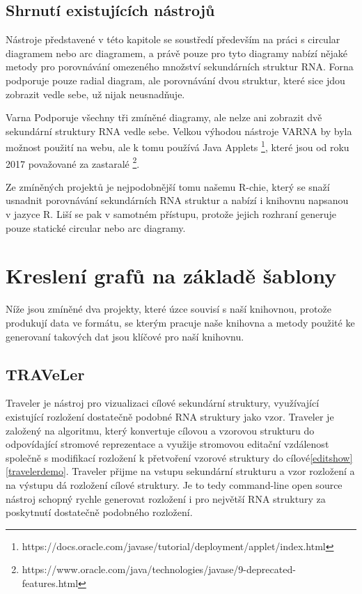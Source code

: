 
\subsection{Shrnutí existujících nástrojů}

Nástroje představené v této kapitole se soustředí především na práci s circular
diagramem nebo arc diagramem, a právě pouze pro tyto diagramy nabízí nějaké
metody pro porovnávání omezeného množství sekundárních struktur RNA. Forna
podporuje pouze radial diagram, ale porovnávání dvou struktur, které sice jdou
zobrazit vedle sebe, už nijak neusnadňuje. 

Varna Podporuje všechny tři zmíněné diagramy, ale nelze ani zobrazit dvě
sekundární struktury RNA vedle sebe. Velkou výhodou nástroje VARNA by byla
možnost použití na webu, ale k tomu používá Java Applets
\footnote{https://docs.oracle.com/javase/tutorial/deployment/applet/index.html},
které jsou od roku 2017 považované za zastaralé
\footnote{https://www.oracle.com/java/technologies/javase/9-deprecated-features.html}.

Ze zmíněných projektů je nejpodobnější tomu našemu R-chie, který se snaží
usnadnit porovnávání sekundárních RNA struktur a nabízí i knihovnu napsanou v
jazyce R. Liší se pak v samotném přístupu, protože jejich rozhraní generuje
pouze statické circular nebo arc diagramy.

\section{Kreslení grafů na základě šablony}

Níže jsou zmíněné dva projekty, které úzce souvisí s naší knihovnou, protože
produkují data ve formátu, se kterým pracuje naše knihovna a metody
použité ke generovaní takových dat jsou klíčové pro naší knihovnu.

\subsection{TRAVeLer} \label{traveler}

Traveler\cite{Traveler2017} je nástroj pro vizualizaci cílové sekundární
struktury, využívající existující rozložení dostatečně podobné RNA struktury
jako vzor. Traveler je založený na algoritmu, který konvertuje cílovou a
vzorovou strukturu do odpovídající stromové reprezentace a využije stromovou
editační vzdálenost společně s modifikací rozložení k přetvoření vzorové
struktury do cílové\ref{editshow}\ref{travelerdemo}. Traveler přijme na vstupu
sekundární strukturu a vzor rozložení a na výstupu dá rozložení cílové
struktury. Je to tedy command-line open source nástroj schopný rychle generovat
rozložení i pro největší RNA struktury za poskytnutí dostatečně podobného
rozložení.

